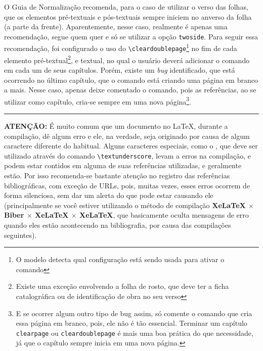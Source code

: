 O Guia de Normalização recomenda, para o caso de utilizar o verso das folhas, que os elementos pré-textuais e pós-textuais sempre iniciem no anverso da folha (a parte da frente). Aparentemente, nesse caso, realmente é apenas uma recomendação, segue quem quer e só se utilizar a opção \texttt{twoside}. Para seguir essa recomendação, foi configurado o uso do \verb|\cleardoublepage|\footnote{O modelo detecta qual configuração está sendo usada para ativar o comando} no fim de cada elemento pré-textual\footnote{Existe uma exceção envolvendo a folha de rosto, que deve ter a ficha catalográfica ou de identificação de obra no seu verso}, e textual, no qual o usuário deverá adicionar o comando em cada um de seus capítulos. Porém, existe um \textit{bug} identificado, que está ocorrendo no último capítulo, que o comando está criando uma página em branco a mais. Nesse caso, apenas deixe comentado o comando, pois as referências, ao se utilizar como capítulo, cria-se sempre em uma nova página\footnote{E se ocorrer algum outro tipo de bug assim, só comente o comando que cria essa página em branco, pois, ele não é tão essencial. Terminar um capítulo \texttt{clearpage} ou \texttt{cleardoublepage} é mais uma boa prática do que necessidade, já que o capítulo sempre inicia em uma nova página.}.

\vspace{\baselineskip}
\begin{Center}
    \rule{12cm}{1pt}
\end{Center}

\textbf{ATENÇÃO:} É muito comum que um documento no \LaTeX, durante a compilação, dê algum erro e ele, na verdade, seja originado por causa de algum caractere diferente do habitual. Alguns caracteres especiais, como o \textunderscore, que deve ser utilizado através do comando \verb|\textunderscore|, levam a erros na compilação, e podem estar contidos em alguma de suas referências utilizadas, e geralmente estão. Por isso recomenda-se bastante atenção no registro das referências bibliográficas, com exceção de URLs, pois, muitas vezes, esses erros ocorrem de forma silenciosa, sem dar um alerta do que pode estar causando ele (principalmente se você estiver utilizando o método de compilação \textbf{XeLaTeX $\times$ Biber $\times$ XeLaTeX $\times$ XeLaTeX}, que basicamente oculta mensagens de erro quando eles estão acontecendo na bibliografia, por causa das compilações seguintes).